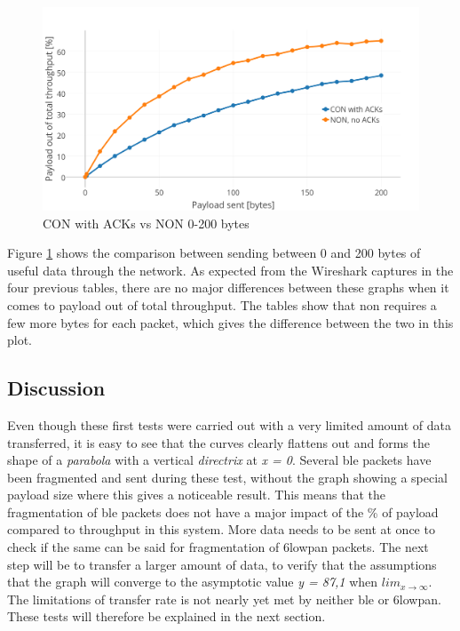 
\begin{figure}[ht]
    \centering
    \includegraphics[width=1.0\textwidth]{CONNONvs0-200acks.png}    
    \caption{CON with ACKs vs NON 0-200 bytes}
    \label{fig:CONvsNON0-200_acks}
\end{figure}

\noindent Figure \ref{fig:CONvsNON0-200_acks} shows the comparison between sending between 0 and 200 bytes of useful data through the network. As expected from the Wireshark captures in the four previous tables, there are no major differences between these graphs when it comes to payload out of total throughput. The tables show that \gls{non} requires a few more bytes for each packet, which gives the difference between the two in this plot. 



\subsection{Discussion}

\noindent Even though these first tests were carried out with a very limited amount of data transferred, it is easy to see that the curves clearly flattens out and forms the shape of a \textit{parabola} with a vertical \textit{directrix} at \textit{x = 0}. Several \gls{ble} packets have been fragmented and sent during these test, without the graph showing a special \gls{payload} size where this gives a noticeable result. This means that the fragmentation of \gls{ble} packets does not have a major impact of the \% of payload compared to throughput in this system. More data needs to be sent at once to check if the same can be said for fragmentation of \gls{6lowpan} packets. The next step will be to transfer a larger amount of data, to verify that the assumptions that the graph will converge to the asymptotic value \textit{y = 87,1} when $lim_{x\to\infty}$. The limitations of transfer rate is not nearly yet met by neither \gls{ble} or \gls{6lowpan}.  These tests will therefore be explained in the next section. 

